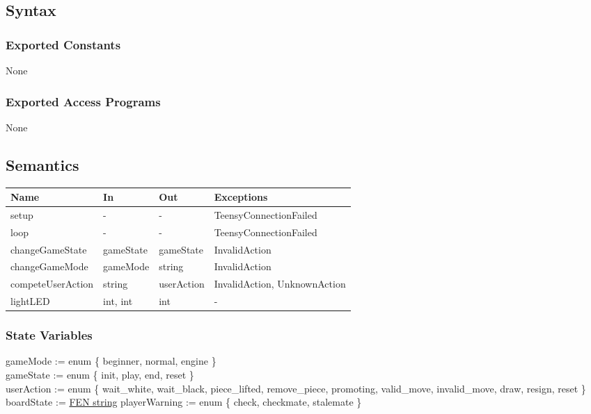 \documentclass[12pt, titlepage]{article}
\begin{document}
\subsection{Syntax}

\subsubsection{Exported Constants}{
  None
}

\subsubsection{Exported Access Programs}
None

\subsection{Semantics}
{
  \begin{center}
  \begin{tabular}{p{4cm} p{3cm} p{3cm} p{4cm}}
  \hline
  \textbf{Name} & \textbf{In} & \textbf{Out} & \textbf{Exceptions} \\
  \hline
  setup & - & - & TeensyConnectionFailed \\
  \midrule
  loop & - & - & TeensyConnectionFailed \\
  \midrule
  changeGameState & gameState & gameState & InvalidAction \\
  \midrule
  changeGameMode & gameMode & string & InvalidAction \\
  \midrule
  competeUserAction & string & userAction & InvalidAction, UnknownAction \\
  \midrule
  lightLED & {int, int} & int & - \\
  \hline
  \end{tabular}
  \end{center}
}

\subsubsection{State Variables}{
  gameMode := enum \{ beginner, normal, engine \}\\
  gameState := enum \{ init, play, end, reset \}\\
  userAction := enum \{ wait\_white, wait\_black, piece\_lifted, remove\_piece, promoting, valid\_move, invalid\_move, draw, resign, reset \}\\
  boardState := \href{https://en.wikipedia.org/wiki/Forsyth%E2%80%93Edwards_Notation}{FEN string}
  playerWarning := enum \{ check, checkmate, stalemate \}\\
}
\end{document}
